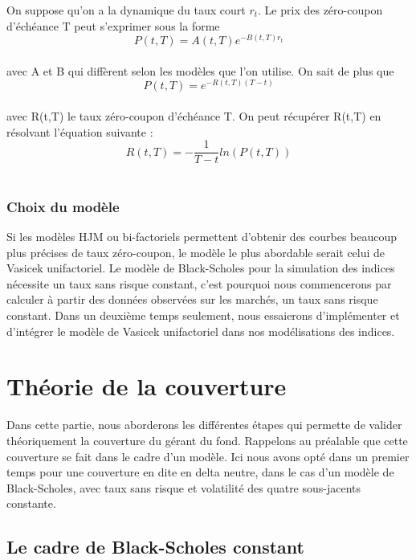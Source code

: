 \documentclass[french,12pt,a4paper]{article}
\begin{document}
On suppose qu'on a la dynamique du taux court $r_{t}$. Le prix des zéro-coupon d'échéance T peut s'exprimer sous la forme \\
$$ P(t,T)=A(t,T)e^{-B(t,T)r_{t}} $$ \\
avec A et B qui diffèrent selon les modèles que l'on utilise. On sait de plus que \\
$$ P(t,T)= e^{-R(t,T)(T-t)} $$ \\
avec R(t,T) le taux zéro-coupon d'échéance T. On peut récupérer R(t,T) en résolvant l'équation suivante : \\
$$ R(t,T)=-\frac{1}{T-t}ln(P(t,T)) $$ \\

\subsubsection{Choix du modèle}
Si les modèles HJM ou bi-factoriels permettent d'obtenir des courbes beaucoup plus précises de taux zéro-coupon, le modèle le plus abordable serait celui de Vasicek unifactoriel. Le modèle de Black-Scholes pour la simulation des indices nécessite un taux sans risque constant, c'est pourquoi nous commencerons par calculer à partir des données observées sur les marchés, un taux sans risque constant. Dans un deuxième temps seulement, nous essaierons d'implémenter et d'intégrer le modèle de Vasicek unifactoriel dans nos modélisations des indices.

\newpage
\section{Théorie de la couverture}
Dans cette partie, nous aborderons les différentes étapes qui permette de valider théoriquement la couverture du gérant du fond. Rappelons au préalable que cette couverture se fait dans le cadre d'un modèle. Ici nous avons opté dans un premier temps pour une couverture en dite en delta neutre, dans le cas d'un modèle de Black-Scholes, avec taux sans risque et volatilité des quatre sous-jacents constante.

\subsection{Le cadre de Black-Scholes constant}
\end{document}
